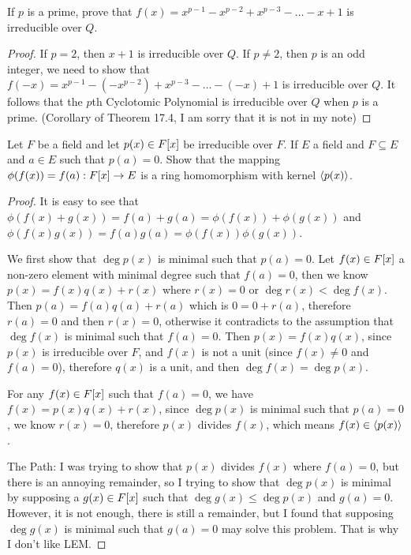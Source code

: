 \documentclass[../main.tex]{subfiles}
\begin{document}
\setcounter{exercise}{37}
\begin{exercise}
  If $p$ is a prime, prove that $f(x) = x^{p - 1} - x^{p - 2} + x^{p - 3} - \dots - x + 1$
  is irreducible over $Q$.
\end{exercise}
\begin{proof}
  If $p = 2$, then $x + 1$ is irreducible over $Q$.
  If $p \neq 2$, then $p$ is an odd integer, we need to show that 
  $f(- x) = x^{p - 1} - (- x^{p - 2}) + x^{p - 3} - \dots - (- x) + 1$
  is irreducible over $Q$.
  It follows that the $p$th Cyclotomic Polynomial is irreducible over $Q$
  when $p$ is a prime. (Corollary of Theorem 17.4, I am sorry that it is not in my note)
\end{proof}

\begin{exercise}
  Let $F$ be a field and let $p(x) \in F[x]$ be irreducible over $F$.
  If $E$ a field and $F \subseteq E$ and $a \in E$ such that $p(a) = 0$.
  Show that the mapping $\phi(f(x)) = f(a) : F[x] \rightarrow E$
  is a ring homomorphism with kernel $\langle p(x) \rangle$.
\end{exercise}
\begin{proof}
  It is easy to see that $\phi(f(x) + g(x)) = f(a) + g(a) = \phi(f(x)) + \phi(g(x))$
  and $\phi(f(x)g(x)) = f(a)g(a) = \phi(f(x))\phi(g(x))$.

  We first show that $\deg p(x)$ is minimal such that $p(a) = 0$.
  Let $f(x) \in F[x]$ a non-zero element with minimal degree such that $f(a) = 0$,
  then we know $p(x) = f(x)q(x) + r(x)$ where $r(x) = 0$ or $\deg r(x) < \deg f(x)$.
  Then $p(a) = f(a)q(a) + r(a)$ which is $0 = 0 + r(a)$, therefore $r(a) = 0$
  and then $r(x) = 0$, otherwise it contradicts to the assumption that $\deg f(x)$
  is minimal such that $f(a) = 0$.
  Then $p(x) = f(x)q(x)$, since $p(x)$ is irreducible over $F$, and $f(x)$ is not a unit
  (since $f(x) \neq 0$ and $f(a) = 0$), therefore $q(x)$ is a unit,
  and then $\deg f(x) = \deg p(x)$.

  For any $f(x) \in F[x]$ such that $f(a) = 0$, we have $f(x) = p(x)q(x) + r(x)$,
  since $\deg p(x)$ is minimal such that $p(a) = 0$, we know $r(x) = 0$,
  therefore $p(x)$ divides $f(x)$, which means $f(x) \in \langle p(x) \rangle$.

  The Path: I was trying to show that $p(x)$ divides $f(x)$ where $f(a) = 0$,
  but there is an annoying remainder, so I trying to show that $\deg p(x)$ is minimal
  by supposing a $g(x) \in F[x]$ such that $\deg g(x) \le \deg p(x)$ and $g(a) = 0$.
  However, it is not enough, there is still a remainder, but I found that supposing
  $\deg g(x)$ is minimal such that $g(a) = 0$ may solve this problem.
  That is why I don't like LEM.
\end{proof}
\end{document}
